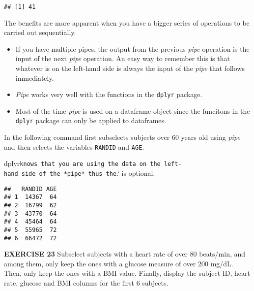 \documentclass[
]{article}
\newenvironment{Shaded}{\begin{snugshade}}{\end{snugshade}}
\newcommand{\DecValTok}[1]{\textcolor[rgb]{0.00,0.00,0.81}{#1}}
\newcommand{\KeywordTok}[1]{\textcolor[rgb]{0.13,0.29,0.53}{\textbf{#1}}}
\newcommand{\NormalTok}[1]{#1}
\newcommand{\OperatorTok}[1]{\textcolor[rgb]{0.81,0.36,0.00}{\textbf{#1}}}
\newcommand{\StringTok}[1]{\textcolor[rgb]{0.31,0.60,0.02}{#1}}
\begin{document}
\begin{verbatim}
## [1] 41
\end{verbatim}

The benefits are more apparent when you have a bigger series of
operations to be carried out sequentially.

\begin{itemize}
\item
  If you have multiple pipes, the output from the previous \emph{pipe}
  operation is the input of the next \emph{pipe} operation. An easy way
  to remember this is that whatever is on the left-hand side is always
  the input of the \emph{pipe} that follows immediately.
\item
  \emph{Pipe} works very well with the functions in the \texttt{dplyr}
  package.
\item
  Most of the time \emph{pipe} is used on a dataframe object since the
  funcitons in the \texttt{dplyr} package can only be applied to
  dataframes.
\end{itemize}

In the following command first subselects subjects over 60 years old
using \emph{pipe} and then selects the variables \texttt{RANDID} and
\texttt{AGE}.

dplyr\texttt{knows\ that\ you\ are\ using\ the\ data\ on\ the\ left-hand\ side\ of\ the\ *pipe*\ thus\ the}.`
is optional.

\begin{Shaded}
\end{Shaded}

\begin{verbatim}
##   RANDID AGE
## 1  14367  64
## 2  16799  62
## 3  43770  64
## 4  45464  64
## 5  55965  72
## 6  66472  72
\end{verbatim}

\textbf{EXERCISE 23} Subselect subjects with a heart rate of over 80
beats/min, and among them, only keep the ones with a glucose measure of
over 200 mg/dL. Then, only keep the ones with a BMI value. Finally,
display the subject ID, heart rate, glucose and BMI columns for the
first 6 subjects.
\end{document}
